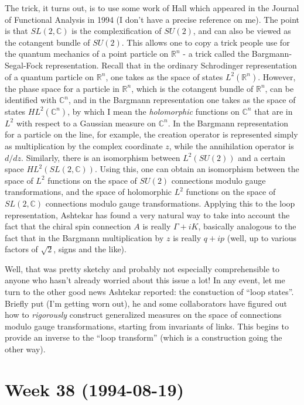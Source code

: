 \documentclass{article}
\begin{document}
The trick, it turns out, is to use some work of Hall which appeared in
the Journal of Functional Analysis in 1994 (I don't have a precise
reference on me). The point is that \(SL(2,\mathbb{C})\) is the
complexification of \(SU(2)\), and can also be viewed as the cotangent
bundle of \(SU(2)\). This allows one to copy a trick people use for the
quantum mechanics of a point particle on \(\mathbb{R}^n\) - a trick
called the Bargmann-Segal-Fock representation. Recall that in the
ordinary Schrodinger representation of a quantum particle on
\(\mathbb{R}^n\), one takes as the space of states
\(L^2(\mathbb{R}^n)\). However, the phase space for a particle in
\(\mathbb{R}^n\), which is the cotangent bundle of \(\mathbb{R}^n\), can
be identified with \(\mathbb{C}^n\), and in the Bargmann representation
one takes as the space of states \(HL^2(\mathbb{C}^n)\), by which I mean
the \emph{holomorphic} functions on \(\mathbb{C}^n\) that are in \(L^2\)
with respect to a Gaussian measure on \(\mathbb{C}^n\). In the Bargmann
representation for a particle on the line, for example, the creation
operator is represented simply as multiplication by the complex
coordinate \(z\), while the annihilation operator is \(d/dz\).
Similarly, there is an isomorphism between \(L^2(SU(2))\) and a certain
space \(HL^2(SL(2,\mathbb{C}))\). Using this, one can obtain an
isomorphism between the space of \(L^2\) functions on the space of
\(SU(2)\) connections modulo gauge transformations, and the space of
holomorphic \(L^2\) functions on the space of \(SL(2,\mathbb{C})\)
connections modulo gauge transformations. Applying this to the loop
representation, Ashtekar has found a very natural way to take into
account the fact that the chiral spin connection \(A\) is really
\(\Gamma + iK\), basically analogous to the fact that in the Bargmann
multiplication by \(z\) is really \(q + ip\) (well, up to various
factors of \(\sqrt{2}\), signs and the like).

Well, that was pretty sketchy and probably not especially comprehensible
to anyone who hasn't already worried about this issue a lot! In any
event, let me turn to the other good news Ashtekar reported: the
constuction of ``loop states''. Briefly put (I'm getting worn out), he
and some collaborators have figured out how to \emph{rigorously}
construct generalized measures on the space of connections modulo gauge
transformations, starting from invariants of links. This begins to
provide an inverse to the ``loop transform'' (which is a construction
going the other way).
\hypertarget{week-38-1994-08-19}{%
\section{Week 38 (1994-08-19)}\label{week-38-1994-08-19}}
\end{document}
